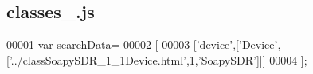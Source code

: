 \subsection{classes\+\_.\+js}
\label{classes__2_8js_source}

\begin{DoxyCode}
00001 var searchData=
00002 [
00003   [\textcolor{stringliteral}{'device'},[\textcolor{stringliteral}{'Device'},[\textcolor{stringliteral}{'../classSoapySDR\_1\_1Device.html'},1,\textcolor{stringliteral}{'SoapySDR'}]]]
00004 ];
\end{DoxyCode}

